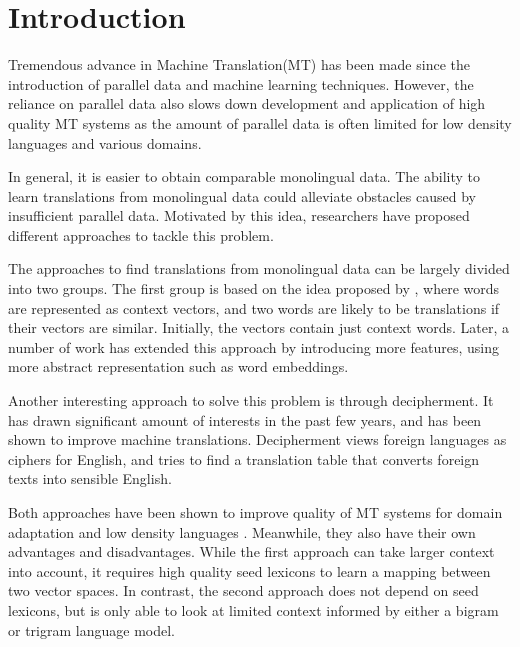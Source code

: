 \section{Introduction}
Tremendous advance in Machine Translation(MT) has been made since the introduction of parallel data and machine learning techniques. However, the reliance on parallel data also slows down development and application of high quality MT systems as the amount of parallel data is often limited for low density languages and various domains.

In general, it is easier to obtain comparable monolingual data. The ability to learn translations from monolingual data could alleviate obstacles caused by insufficient parallel data. Motivated by this idea, researchers have proposed different approaches to tackle this problem. 

The approaches to find translations from monolingual data can be largely divided into two groups. The first group is based on the idea proposed by , where words are represented as context vectors, and two words are likely to be translations if their vectors are similar. Initially, the vectors contain just context words. Later, a number of work has extended this approach by introducing more features\cite{haghighi-EtAl:2008:ACLMain,Garera:2009,Bergsma:2011,Daume:2011:DAM:2002736.2002819,irvine-callisonburch:2013,irvine-callisonburch:2013:WMT}, using more abstract representation such as word embeddings\cite{KlementievCOLING}.

Another interesting approach to solve this problem is through decipherment. It has drawn significant amount of interests in the past few years\cite{ravi-knight:2011,Nuhn:2012,dou-knight:2013:EMNLP,ravi:2013}, and has been shown to improve machine translations. Decipherment views foreign languages as ciphers for English, and tries to find a translation table that converts foreign texts into sensible English. 

Both approaches have been shown to improve quality of MT systems for domain adaptation \cite{Daume:2011:DAM:2002736.2002819,Dou:2012,irvineQuirkDaumeEMNLP13} and low density languages \cite{irvine-callisonburch:2013:WMT,dou-vaswani-knight:2014:EMNLP2014}. Meanwhile, they also have their own advantages and disadvantages. While the first approach can take larger context into account, it requires high quality seed lexicons to learn a mapping between two vector spaces. In contrast, the second approach does not depend on seed lexicons, but is only able to look at limited context informed by either a bigram or trigram language model.  

